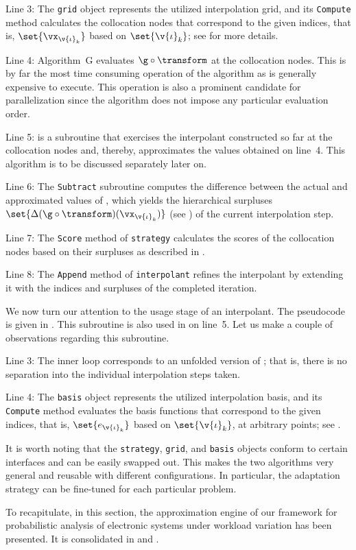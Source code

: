 Line 3: The \texttt{grid} object represents the utilized interpolation grid, and
its \texttt{Compute} method calculates the collocation nodes that correspond to
the given indices, that is, $\set{\vx_{\v{\iota}_k}}$ based on
$\set{\v{\iota}_k}$; see  for more details.

Line 4: Algorithm~G evaluates $\g \circ \transform$ at the collocation nodes.
This is by far the most time consuming operation of the algorithm as \g is
generally expensive to execute. This operation is also a prominent candidate for
parallelization since the algorithm does not impose any particular evaluation
order.

Line 5:  is a subroutine that exercises the interpolant
constructed so far at the collocation nodes and, thereby, approximates the
values obtained on line~4. This algorithm is to be discussed separately later
on.

Line 6: The \texttt{Subtract} subroutine computes the difference between the
actual and approximated values of \g, which yields the hierarchical surpluses
$\set{\Delta(\g \circ \transform)(\vx_{\v{\iota}_k})}$ (see
) of the current interpolation step.

Line 7: The \texttt{Score} method of \texttt{strategy} calculates the scores of
the collocation nodes based on their surpluses as described in
.

Line 8: The \texttt{Append} method of \texttt{interpolant} refines the
interpolant by extending it with the indices and surpluses of the completed
iteration.

We now turn our attention to the usage stage of an interpolant. The pseudocode
is given in . This subroutine is also used in
 on line~5. Let us make a couple of observations
regarding this subroutine.

Line 3: The inner loop corresponds to an unfolded version of
; that is, there is no separation into the individual
interpolation steps taken.

Line 4: The \texttt{basis} object represents the utilized interpolation basis,
and its \texttt{Compute} method evaluates the basis functions that correspond to
the given indices, that is, $\set{e_{\v{\iota}_k}}$ based on
$\set{\v{\iota}_k}$, at arbitrary points; see .

It is worth noting that the \texttt{strategy}, \texttt{grid}, and \texttt{basis}
objects conform to certain interfaces and can be easily swapped out. This makes
the two algorithms very general and reusable with different configurations. In
particular, the adaptation strategy can be fine-tuned for each particular
problem.

\conclusioncut
To recapitulate, in this section, the approximation engine of our framework for
probabilistic analysis of electronic systems under workload variation has been
presented. It is consolidated in  and
.
